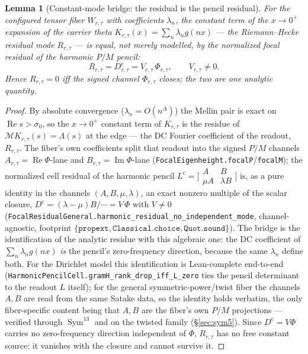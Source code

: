 \documentclass[11pt]{article}
\newtheorem{lemma}[theorem]{Lemma}
\theoremstyle{definition}
\renewcommand{\Re}{\operatorname{Re}}
\newcommand{\Sym}{\operatorname{Sym}}
\begin{document}
\begin{lemma}[Constant-mode bridge: the residual is the pencil residual]\label{lem:bridge}
For the configured tensor fiber $W_{r,\tau}$ with coefficients $\lambda_n$, the constant term of the
$x\to0^{+}$ expansion of the carrier theta $K_{r,\tau}(x)=\sum_{n}\lambda_n g(nx)$ --- the Riemann--Hecke
residual mode $R_{r,\tau}$ --- is \emph{equal}, not merely modelled, by the normalized focal residual of the
harmonic $P/M$ pencil:
\[
  R_{r,\tau}=D^{\mathrm c}_{r,\tau}=V_{r,\tau}\,\Phi_{r,\tau},\qquad V_{r,\tau}\neq0 .
\]
Hence $R_{r,\tau}=0$ iff the signed channel $\Phi_{r,\tau}$ closes; the two are one analytic quantity.
\end{lemma}
\begin{proof}
By absolute convergence ($\lambda_n=O(n^{A})$) the Mellin pair is exact on $\Re s>\sigma_0$, so the $x\to0^{+}$
constant term of $K_{r,\tau}$ is the residue of $\mathcal M K_{r,\tau}(s)=\Lambda(s)$ at the edge --- the DC
Fourier coefficient of the readout, $R_{r,\tau}$. The fiber's own coefficients split that readout into the signed
$P/M$ channels $A_{r,\tau}=\operatorname{Re}\Phi$-lane and $B_{r,\tau}=\operatorname{Im}\Phi$-lane
(\texttt{FocalEigenheight.focalP}/\texttt{focalM}); the normalized cell residual of the harmonic pencil
$L^{\mathrm c}=\big[\begin{smallmatrix}A&B\\ \mu A&\lambda B\end{smallmatrix}\big]$ is, as a pure identity in the
channels $(A,B,\mu,\lambda)$, an exact nonzero multiple of the scalar closure,
$D^{\mathrm c}=(\lambda-\mu)B/\!\cdots=V\,\Phi$ with $V\neq0$
(\texttt{FocalResidualGeneral.harmonic\_residual\_no\_independent\_mode}, channel-agnostic, footprint
$\{\texttt{propext},\texttt{Classical.choice},\texttt{Quot.sound}\}$). The bridge is the identification of the
analytic residue with this algebraic one: the DC coefficient of $\sum_n\lambda_n g(nx)$ \emph{is} the pencil's
zero-frequency direction, because the same $\lambda_n$ define both. For the Dirichlet model this identification is
Lean-complete end-to-end (\texttt{HarmonicPencilCell.gramH\_rank\_drop\_iff\_L\_zero} ties the pencil determinant
to the readout $L$ itself); for the general symmetric-power/twist fiber the channels $A,B$ are read from the same
Satake data, so the identity holds verbatim, the only fiber-specific content being that $A,B$ are the fiber's own
$P/M$ projections --- verified through $\Sym^{13}$ and on the twisted family (\S\ref{sec:sym5}). Since
$D^{\mathrm c}=V\Phi$ carries no zero-frequency direction independent of $\Phi$, $R_{r,\tau}$ has no free constant
source: it vanishes with the closure and cannot survive it.
\end{proof}
\end{document}
